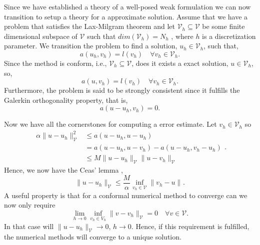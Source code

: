 Since we have established a theory of a well-posed weak formulation we can now transition to setup a theory for a approximate solution. Assume that we have a problem that satisfies the Lax-Milgram theorem and let $\mathcal{V} _{h} \subseteq  \mathcal{V} $  be
some finite dimensional subspace of $\mathcal{V} $ such that $dim\left( \mathcal{V} _{h} \right) =N_{h}$ , where $h$  is a discretization parameter. We transition the problem to find a solution, $u_{h} \in  \mathcal{V}_{h}$, such that,
$$a\left( u_{h},v_{h} \right)  =
l\left( v_{h} \right) \quad  \forall v_{h} \in \mathcal{V} _{h} .$$
Since the method is conform, i.e., $\mathcal{V} _{h} \subseteq  \mathcal{V} $, does it exists a exact solution, $u \in  \mathcal{V} _{h}$, so, \[
a \left( u, v_{h} \right)  = l\left( v_{h} \right)  \quad  \forall v_{h} \in  \mathcal{V} _{h}.
\]
Furthermore, the problem is said to be strongly consistent since it fulfills the Galerkin orthogonality property, that is,
$$ a\left( u -u_{h} , v_{h} \right)  =0.$$

Now we have all the cornerstones for computing a error estimate. Let $v_{h} \in  \mathcal{V} _{h}$ so
\begin{equation}
\label{eq:cealemma_proof}
    \begin{split}
\alpha \| u -u_{h} \|_{ \mathcal{V}  }^{ 2 } & \le  a\left( u - u_{h}, u - u_{h}  \right)    \\
&= a\left( u - u_{h}, u -v_{h} \right) - a\left( u -u_{h}, v_{h} - u_{h} \right)  \\
 &  \le  M \| u - u_{h} \|_{ \mathcal{V}  }^{  }  \| u - v_{h} \|_{ \mathcal{V}  }^{  }
    \end{split}
.\end{equation}
Hence, we now have the Ceas' lemma \cite{quartdiff}, \[
\| u - u_{h} \|_{ \mathcal{V}  }^{  }  \le  \frac{M}{\alpha } \inf_{v_{h} \in \mathcal{V} } \|  v_{h} - u \|_{  }^{  }.
\]
A useful property is that for a conformal numerical method to converge can we now only require \[
\lim_{h \to 0}  \inf_{v_{h} \in  V_{h}}  \| v - v_{h} \|_{ \mathcal{V }  }^{  } = 0 \quad  \forall v \in \mathcal{V}.
\]
In that case will $\| u - u_{h} \|_{ \mathcal{V}  }^{  }  \to  0$, $h \to  0$. Hence, if this requirement is fulfilled, the numerical methods will converge to a unique solution.



